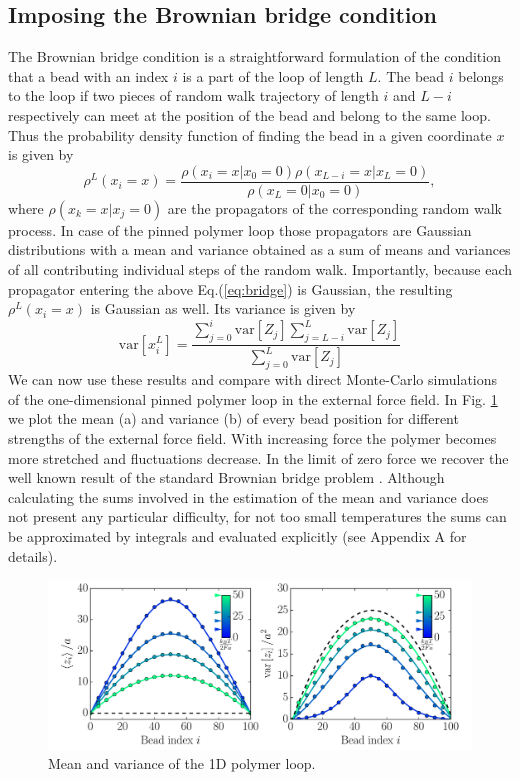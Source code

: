 \documentclass[aps,showpacs,twocolumn,floatfix,prx,superscriptaddress]{revtex4-1}
\begin{document}
\subsection{Imposing the Brownian bridge condition}
The Brownian bridge condition is a straightforward formulation of the condition that a bead with an index $i$ is a part of the loop of length $L$. The bead $i$ belongs to the loop if two pieces of random walk trajectory of length $i$ and $L-i$ respectively can meet at the position of the bead and belong to the same loop. Thus the probability density function of finding the bead in a given coordinate $x$ is given by
\begin{equation}
    \label{eq:bridge}
    \rho^L\left(x_i = x\right) = \frac{\rho\left(x_i = x \vert x_0 = 0\right)
        \rho\left(x_{L-i} = x \vert x_L = 0\right)}{\rho\left(x_L = 0 \vert x_0
            = 0\right)},
\end{equation}
where $ \rho\left(x_k = x \vert x_j = 0\right)$ are the propagators of the corresponding random walk process. In case of the pinned polymer loop those propagators are Gaussian distributions with a mean and variance obtained as a sum of means and variances of all contributing individual steps of the random walk. Importantly, because each propagator entering the above Eq.(\ref{eq:bridge}) is Gaussian, the resulting $\rho^L\left(x_i = x\right)$ is Gaussian as well. Its variance is given by
\begin{equation}
    \text{var}\left[x_i^L\right] =
    \frac{\sum_{j=0}^i\text{var}\left[Z_j\right]\sum_{j=L-i}^L\text{var}\left[Z_j\right]}{\sum_{j=0}^L\text{var}\left[Z_j\right]}
\end{equation}
We can now use these results and compare with direct Monte-Carlo simulations of
the one-dimensional pinned polymer loop in the external force field. In Fig.
\ref{fig:meanVar} we plot the mean (a) and variance (b) of every bead position for different strengths of the external force field. With increasing force the polymer becomes more stretched and fluctuations decrease. In the limit of zero force we recover the well known result of the standard Brownian bridge problem \cite{}. Although calculating the sums involved in the estimation of the mean and variance does not present any particular difficulty, for not too small temperatures the sums can be approximated by integrals and evaluated explicitly (see Appendix A for details). 
\begin{figure}[htpb]
    \centering
    \includegraphics[width=1.0\linewidth]{meanVar}
    \caption{Mean and variance of the 1D polymer loop.}
    \label{fig:meanVar}
\end{figure}
\end{document}
